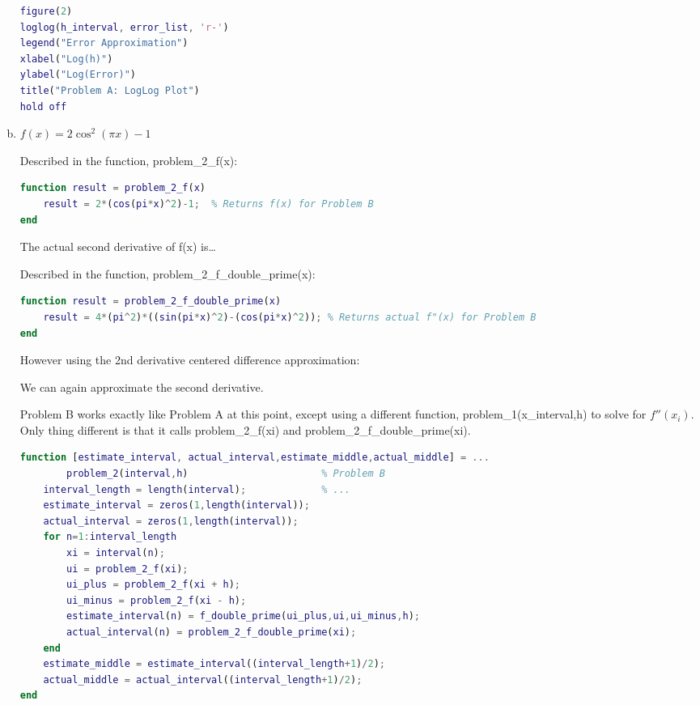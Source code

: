 \documentclass[10pt,letterpaper]{article}
\begin{document}
\begin{enumerate}[a)]
     \begin{lstlisting}[language = Matlab]
% Plotting Problem A: LogLog Plot
figure(2)
loglog(h_interval, error_list, 'r-')
legend("Error Approximation")
xlabel("Log(h)")
ylabel("Log(Error)")
title("Problem A: LogLog Plot")
hold off
    \end{lstlisting}
    
\pagebreak
  \item
    $f(x) = 2 \cos^2(\pi x) -1$

    Described in the function, problem\_2\_f(x):
    
      \begin{lstlisting}[language = Matlab]
function result = problem_2_f(x)
    result = 2*(cos(pi*x)^2)-1;  % Returns f(x) for Problem B
end \end{lstlisting}

    The actual second derivative of f(x) is\ldots

    Described in the function, problem\_2\_f\_double\_prime(x):
     \begin{lstlisting}[language = Matlab]
function result = problem_2_f_double_prime(x)
    result = 4*(pi^2)*((sin(pi*x)^2)-(cos(pi*x)^2)); % Returns actual f"(x) for Problem B
end \end{lstlisting}
    
    However using the 2nd derivative centered difference approximation:
    
    
    We can again approximate the second derivative.

    Problem B works exactly like Problem A at this point, except using a different function, problem\_1(x\_interval,h) to solve for $f''(x_i)$. Only thing different is that it calls problem\_2\_f(xi) and problem\_2\_f\_double\_prime(xi).
     \begin{lstlisting}[language = Matlab]
function [estimate_interval, actual_interval,estimate_middle,actual_middle] = ...
        problem_2(interval,h)                       % Problem B
    interval_length = length(interval);             % ...
    estimate_interval = zeros(1,length(interval));
    actual_interval = zeros(1,length(interval));
    for n=1:interval_length
        xi = interval(n);
        ui = problem_2_f(xi);
        ui_plus = problem_2_f(xi + h);
        ui_minus = problem_2_f(xi - h);
        estimate_interval(n) = f_double_prime(ui_plus,ui,ui_minus,h);
        actual_interval(n) = problem_2_f_double_prime(xi);
    end
    estimate_middle = estimate_interval((interval_length+1)/2);
    actual_middle = actual_interval((interval_length+1)/2);
end\end{lstlisting}


\end{enumerate}
\end{document}

